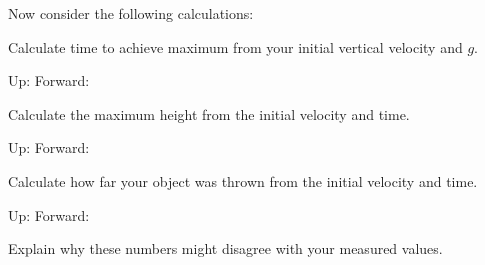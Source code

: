 \documentclass{handout}
\begin{document}
Now consider the following calculations:
\begin{questions}
\question Calculate time to achieve maximum from your initial vertical velocity and $g$.

    Up: \hspace{\fill} Forward: \hspace{\fill}
    \answerspace{1.5in}

\question Calculate the maximum height from the initial velocity and time.

    Up: \hspace{\fill} Forward: \hspace{\fill}
    \answerspace{1.5in}

\question Calculate how far your object was thrown from the initial velocity and time.

    Up: \hspace{\fill} Forward: \hspace{\fill}
    \answerspace{1.5in}

\question Explain why these numbers might disagree with your measured values.
\answerspace{1.5in}
\end{questions}
\end{document}
